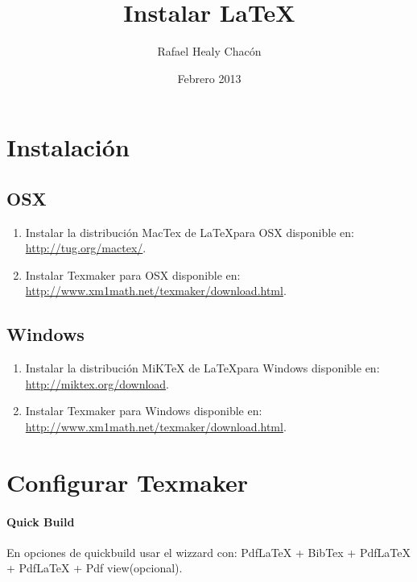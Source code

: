 \documentclass[12pt, a4paper]{article}
\title{Instalar \LaTeX}
\author{Rafael Healy Chacón}
\date{Febrero 2013}
\begin{document}
\maketitle

\section{Instalación}
\subsection{OSX}
\begin{enumerate}
\item Instalar la distribución MacTex de \LaTeX para OSX disponible en: \url{http://tug.org/mactex/}.
\item Instalar Texmaker para OSX disponible en: \url{http://www.xm1math.net/texmaker/download.html}.
\end{enumerate}

\subsection{Windows}
\begin{enumerate}
\item Instalar la distribución MiKTeX de \LaTeX para Windows disponible en: \url{http://miktex.org/download}.
\item Instalar Texmaker para Windows disponible en: \url{http://www.xm1math.net/texmaker/download.html}.
\end{enumerate}

\section{Configurar Texmaker}
\paragraph{Quick Build}
En opciones de quickbuild usar el wizzard con: PdfLaTeX + BibTex + PdfLaTeX + PdfLaTeX + Pdf view(opcional).
\end{document}
